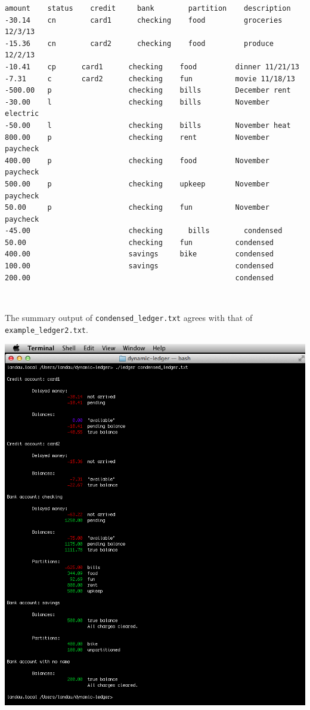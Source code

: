 \documentclass{article}
\providecommand{\q}{$\quad$ \newline}
\begin{document}
\begin{flushleft}
\begin{lstlisting}[title=condensed\_ledger.txt]
amount    status	credit     bank        partition    description
-30.14    cn	    card1      checking    food         groceries 12/3/13
-15.36    cn	    card2      checking    food         produce 12/2/13
-10.41    cp      card1      checking    food         dinner 11/21/13
-7.31     c       card2      checking    fun          movie 11/18/13
-500.00   p                  checking    bills        December rent
-30.00    l	                 checking    bills        November electric
-50.00    l	                 checking    bills        November heat
800.00    p                  checking    rent         November paycheck
400.00    p                  checking    food         November paycheck
500.00    p                  checking    upkeep       November paycheck
50.00     p                  checking    fun          November paycheck
-45.00                       checking	   bills        condensed
50.00                        checking    fun          condensed
400.00                       savings     bike         condensed
100.00                       savings                  condensed
200.00                                                condensed
\end{lstlisting} \q

The summary output of {\tt condensed\_ledger.txt} agrees with that of  {\tt example\_ledger2.txt}.

\begin{center}
\includegraphics[scale=.5]{fig/sum2.png}
\end{center} \q




\end{flushleft}
\end{document}
